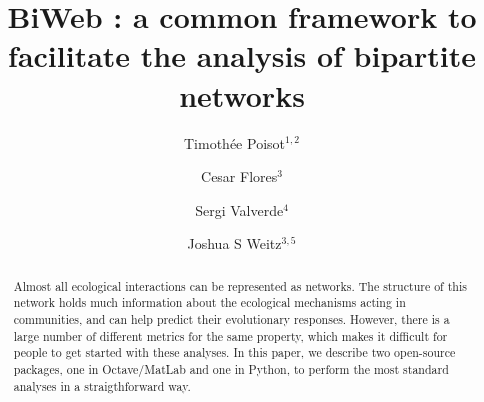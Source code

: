 \documentclass[10pt]{bmc_article}
\newenvironment{bmcformat}{\fussy\setboolean{publ}{true}}{\fussy}
\begin{document}
\begin{bmcformat}

\title{BiWeb : a common framework to facilitate the analysis of bipartite networks}
 
\author{Timoth\'ee Poisot\correspondingauthor$^{1,2}$%
       \and 
        Cesar Flores$^3$%
       \and 
        Sergi Valverde$^4$%
         \and
        Joshua S Weitz$^{3,5}$%
      }
      

\address{%
    \iid(1) UQAR\\
    \iid(2) Qu\'ebec Centre for Biodiversity Science\\
    \iid(3) \textcolor{red}{School of Physics, Georgia Institute of Technology, Atlanta, GA 30332}\\
    \iid(4) \textcolor{red}{Universitat Pompeu Fabra, Barcelona, Spain}\\
    \iid(5) \textcolor{red}{School of Biology, Georgia Institute of Technology, Atlanta, GA 30332}    
}%

\maketitle



\begin{abstract}
  Almost all ecological interactions can be represented as networks. The
  structure of this network holds much information about the ecological
  mechanisms acting in communities, and can help predict their evolutionary
  responses. However, there is a large number of different metrics for the
  same property, which makes it difficult for people to get started with these
  analyses. In this paper, we describe two open-source packages, one in
  Octave/MatLab and one in Python, to perform the most standard analyses in a
  straigthforward way.
\end{abstract}


\end{bmcformat}
\end{document}
